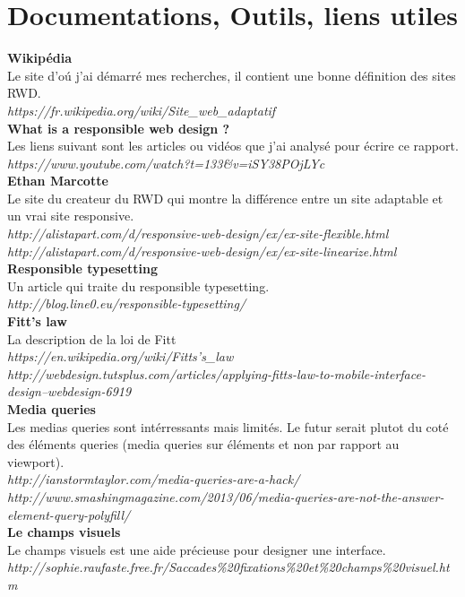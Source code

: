 \documentclass{article}
\begin{document}
\section{Documentations, Outils, liens utiles} 
\textbf{Wikip\'edia}\\
Le site d'o\'u j'ai d\'emarr\'e mes recherches, il contient une bonne d\'efinition des sites RWD.\\
\textit{https://fr.wikipedia.org/wiki/Site\_web\_adaptatif}
\vspace{0.5cm}\\
\textbf{What is a responsible web design ?}\\
Les liens suivant sont les articles ou vid\'eos que j'ai analys\'e pour \'ecrire ce rapport.\\
\textit{https://www.youtube.com/watch?t=133\&v=iSY38POjLYc}
\vspace{0.5cm}\\
\textbf{Ethan Marcotte}\\
Le site du createur du RWD qui montre la diff\'erence entre un site adaptable et un vrai site responsive.\\
\textit{http://alistapart.com/d/responsive-web-design/ex/ex-site-flexible.html}\\
\textit{http://alistapart.com/d/responsive-web-design/ex/ex-site-linearize.html}
\vspace{0.5cm}\\
\textbf{Responsible typesetting}\\
Un article qui traite du responsible typesetting.\\
\textit{http://blog.line0.eu/responsible-typesetting/}
\vspace{0.5cm}\\
\textbf{Fitt's law}\\
La description de la loi de Fitt\\
\textit{https://en.wikipedia.org/wiki/Fitts's\_law}\\
\textit{http://webdesign.tutsplus.com/articles/applying-fitts-law-to-mobile-interface-design--webdesign-6919}
\vspace{0.5cm}\\
\textbf{Media queries}\\
Les medias queries sont int\'erressants mais limit\'es. Le futur serait plutot du cot\'e des \'el\'ements queries (media queries sur \'el\'ements et non par rapport au viewport).\\
\textit{http://ianstormtaylor.com/media-queries-are-a-hack/}\\
\textit{http://www.smashingmagazine.com/2013/06/media-queries-are-not-the-answer-element-query-polyfill/}
\vspace{0.5cm}\\
\textbf{Le champs visuels}\\
Le champs visuels est une aide pr\'ecieuse pour designer une interface.\\
\textit{http://sophie.raufaste.free.fr/Saccades\%20fixations\%20et\%20champs\%20visuel.htm}\\
\end{document}
